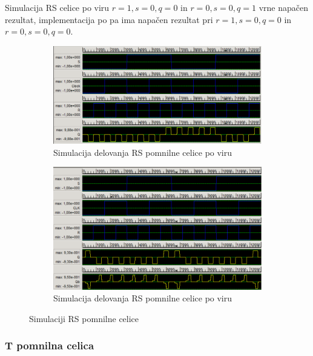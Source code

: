 \documentclass[a4paper, 11pt]{article}
\begin{document}
Simulacija RS celice po viru \cite{quantum_dot} $r=1,s=0,q=0$ in $r=0,s=0,q=1$ vrne napačen rezultat, implementacija po \cite{a_novel_approach} pa ima napačen rezultat pri  $r=1,s=0,q=0$ in  $r=0,s=0,q=0$.

\begin{figure}[h!]
	\begin{subfigure}[b]{\textwidth}
	\includegraphics[width=\textwidth]{../img/vir_4/sim_sr.png}
	\caption{Simulacija delovanja RS pomnilne celice po viru \cite{quantum_dot}}
	\label{fig-rs-1-sim}
	\end{subfigure}
	\begin{subfigure}[b]{\textwidth}
	\includegraphics[width=\textwidth]{../img/vir_5/sim_rs.png}
	\caption{Simulacija delovanja RS pomnilne celice po viru \cite{a_novel_approach}}
	\label{fig-rs-2-sim}
	\end{subfigure}
	\caption{Simulaciji RS pomnilne celice}
	\label{fig-rs-sim}
\end{figure}

\subsubsection{T pomnilna celica}
\end{document}
